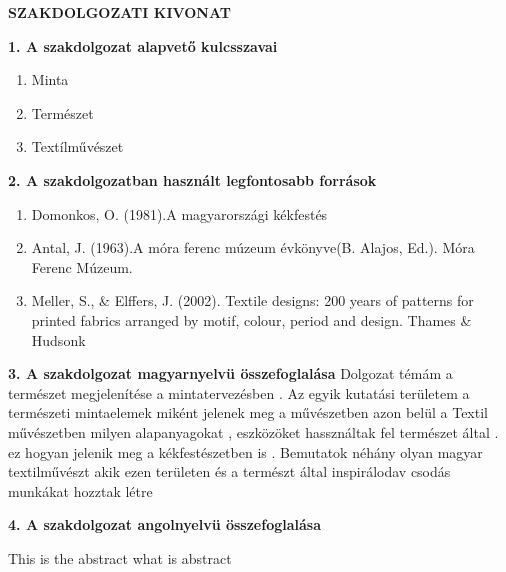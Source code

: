 \thispagestyle{plain}
\begin{center}
    \Large
    \textbf{SZAKDOLGOZATI KIVONAT}
\end{center}
\textbf{1. A szakdolgozat alapvető kulcsszavai}
\begin{enumerate}[label=\alph*)]
	\item Minta
	\item Természet
	\item Textílművészet
\end{enumerate}
\textbf{2. A szakdolgozatban használt legfontosabb források}
\begin{enumerate}[label=\alph*)]
	\item Domonkos, O. (1981).A magyarországi kékfestés
	\item Antal, J. (1963).A móra ferenc múzeum évkönyve(B. Alajos, Ed.). Móra Ferenc Múzeum.
	\item Meller, S., \& Elffers, J. (2002). Textile designs: 200 years of patterns for printed fabrics arranged by motif, colour, period and design. Thames \& Hudsonk
\end{enumerate}
\newpage
\textbf{3. A szakdolgozat magyarnyelvü összefoglalása}
\vspace{0.2 cm}
Dolgozat témám a természet megjelenítése a mintatervezésben .
Az egyik kutatási területem a természeti mintaelemek miként jelenek meg a művészetben azon belül a Textil művészetben milyen alapanyagokat , eszközöket  hassználtak fel természet által .
ez hogyan jelenik  meg a kékfestészetben is .
Bemutatok néhány olyan magyar textilművészt akik ezen területen és a természt által inspirálodav csodás munkákat hozztak létre

\vspace{2 cm}

\textbf{4. A szakdolgozat angolnyelvü összefoglalása}
\vspace{0.2 cm}
\begin{otherlanguage}{english}
This is the abstract what is abstract
\end{otherlanguage}
\newpage